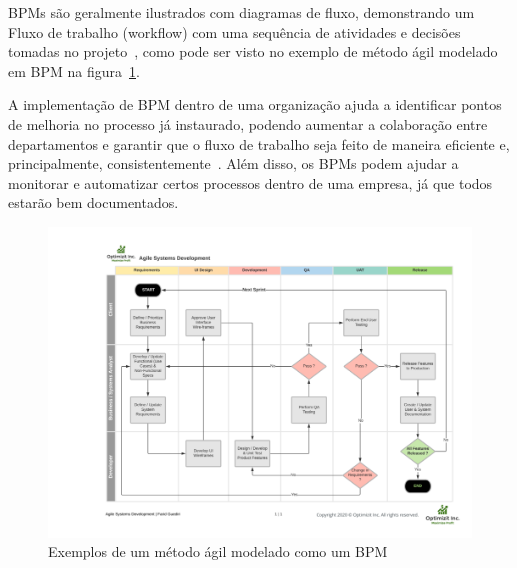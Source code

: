 
BPMs são geralmente ilustrados com diagramas de fluxo, demonstrando um Fluxo de trabalho (workflow) com uma sequência de atividades e decisões tomadas no projeto~\cite{Entringer2021ComparativeStudy}, como pode ser visto no exemplo de método ágil modelado em BPM na figura~\ref{fig:bpm}.

A implementação de BPM dentro de uma organização ajuda a identificar pontos de melhoria no processo já instaurado, podendo aumentar a colaboração entre departamentos e garantir que o fluxo de trabalho seja feito de maneira eficiente e, principalmente, consistentemente~\cite{DaSilva2014BusinessNot}.
Além disso, os BPMs podem ajudar a monitorar e automatizar certos processos dentro de uma empresa, já que todos estarão bem documentados.

\begin{figure}
    \centering
    \includegraphics[width=1\textwidth]{imgs/BPM/sprint as bpm.png}
    \caption{Exemplos de um método ágil modelado como um BPM}
    \label{fig:bpm}
\end{figure}



